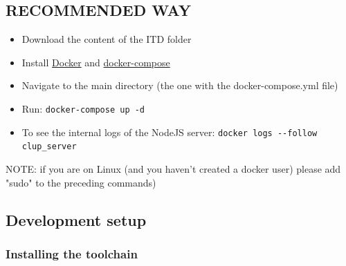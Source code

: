 \documentclass[
]{article}
\begin{document}
\subsection{RECOMMENDED WAY}\label{recommended-install}
\begin{itemize}
  \item Download the content of the ITD folder
  \item Install \href{https://docs.docker.com/get-docker/}{Docker} and \href{https://docs.docker.com/compose/install/}{docker-compose}
  \item Navigate to the main directory (the one with the docker-compose.yml file)
  \item Run: \texttt{docker-compose up -d}
  \item To see the internal logs of the NodeJS server: \texttt{docker logs -\/-follow clup\_server}
\end{itemize}



NOTE: if you are on Linux (and you haven't created a docker user) please add "sudo" to the preceding commands)



\subsection{Development setup}\label{dev-install}

\hypertarget{installing-the-toolchain}{%
\subsubsection{Installing the toolchain}\label{installing-the-toolchain}}
\end{document}

